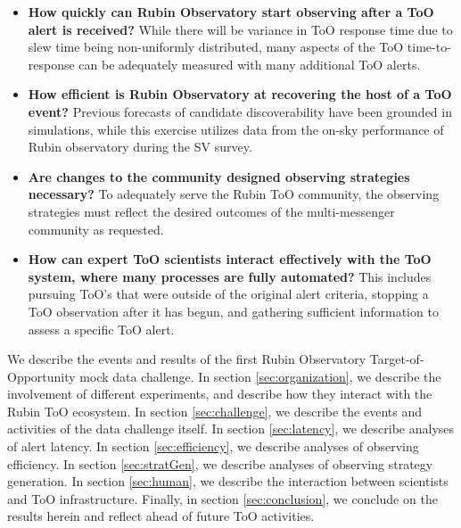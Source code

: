 \begin{itemize}
    \item \textbf{How quickly can Rubin Observatory start observing after a ToO alert is received?} While there will be variance in ToO response time due to slew time being non-uniformly distributed, many aspects of the ToO time-to-response can be adequately measured with many additional ToO alerts.
    \item \textbf{How efficient is Rubin Observatory at recovering the host of a ToO event?} Previous forecasts of candidate discoverability have been grounded in simulations, while this exercise utilizes data from the on-sky performance of Rubin observatory during the SV survey.
    \item \textbf{Are changes to the community designed observing strategies necessary?} To adequately serve the Rubin ToO community, the observing strategies must reflect the desired outcomes of the multi-messenger community as requested.
    \item \textbf{How can expert ToO scientists interact effectively with the ToO system, where many processes are fully automated?} This includes pursuing ToO's that were outside of the original alert criteria, stopping a ToO observation after it has begun, and gathering sufficient information to assess a specific ToO alert.
\end{itemize}

We describe the events and results of the first Rubin Observatory Target-of-Opportunity mock data challenge. In section \ref{sec:organization}, we describe the involvement of different experiments, and describe how they interact with the Rubin ToO ecosystem. In section \ref{sec:challenge}, we describe the events and activities of the data challenge itself. In section \ref{sec:latency}, we describe analyses of alert latency. In section \ref{sec:efficiency}, we describe analyses of observing efficiency. In section \ref{sec:stratGen}, we describe analyses of observing strategy generation. In section \ref{sec:human}, we describe the interaction between scientists and ToO infrastructure. Finally, in section \ref{sec:conclusion}, we conclude on the results herein and reflect ahead of future ToO activities.

\newpage